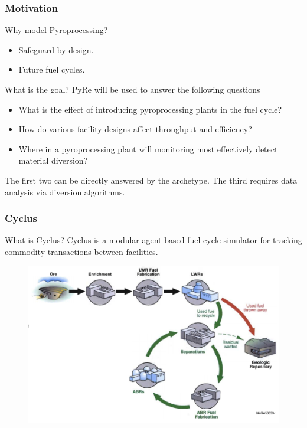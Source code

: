 \begin{frame}
  \frametitle{Motivation}
  \begin{block}{Why model Pyroprocessing?}
  	\begin{itemize}
  		\item Safeguard by design.
  		\item Future fuel cycles.
  	\end{itemize}
  \end{block}
 \begin{block}{What is the goal?}
 	PyRe will be used to answer the following questions
 	\begin{itemize}
 		\item What is the effect of introducing pyroprocessing plants in the fuel cycle?
 		\item How do various facility designs affect throughput and efficiency?
 		\item Where in a pyroprocessing plant will monitoring most 
 		effectively detect material diversion?
 	\end{itemize}
\end{block}
The first two can be directly answered by the archetype. The third requires data analysis via
diversion algorithms.	
\end{frame}

\begin{frame}
\frametitle{Cyclus}
\begin{block}{What is Cyclus?}
	Cyclus is a modular agent based fuel cycle simulator for tracking commodity transactions
	between facilities.
\end{block}
\begin{figure}
	\centering
	\includegraphics[width=0.7\linewidth]{lanl-fuel-cycle.png}
\end{figure}
\end{frame}

